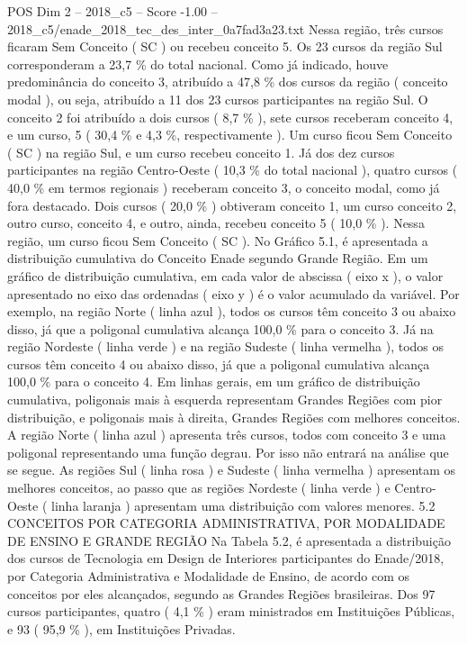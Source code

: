 \begin{textsample}{POS Dim 2 – 2018\_c5 – Score -1.00 – 2018\_c5/enade\_2018\_tec\_des\_inter\_0a7fad3a23.txt}
Nessa região, três cursos ficaram Sem Conceito ( SC ) ou recebeu conceito 5.
Os 23 cursos da região Sul corresponderam a 23,7 \% do total nacional.
Como já indicado, houve predominância do conceito 3, atribuído a 47,8 \% dos cursos da região ( conceito modal ), ou seja, atribuído a 11 dos 23 cursos participantes na região Sul.
O conceito 2 foi atribuído a dois cursos ( 8,7 \% ), sete cursos receberam conceito 4, e um curso, 5 ( 30,4 \% e 4,3 \%, respectivamente ).
Um curso ficou Sem Conceito ( SC ) na região Sul, e um curso recebeu conceito 1.
Já dos dez cursos participantes na região Centro-Oeste ( 10,3 \% do total nacional ), quatro cursos ( 40,0 \% em termos regionais ) receberam conceito 3, o conceito modal, como já fora destacado.
Dois cursos ( 20,0 \% ) obtiveram conceito 1, um curso conceito 2, outro curso, conceito 4, e outro, ainda, recebeu conceito 5 ( 10,0 \% ).
Nessa região, um curso ficou Sem Conceito ( SC ).
No Gráfico 5.1, é apresentada a distribuição cumulativa do Conceito Enade segundo Grande Região.
Em um gráfico de distribuição cumulativa, em cada valor de abscissa ( eixo x ), o valor apresentado no eixo das ordenadas ( eixo y ) é o valor acumulado da variável.
Por exemplo, na região Norte ( linha azul ), todos os cursos têm conceito 3 ou abaixo disso, já que a poligonal cumulativa alcança 100,0 \% para o conceito 3.
Já na região Nordeste ( linha verde ) e na região Sudeste ( linha vermelha ), todos os cursos têm conceito 4 ou abaixo disso, já que a poligonal cumulativa alcança 100,0 \% para o conceito 4.
Em linhas gerais, em um gráfico de distribuição cumulativa, poligonais mais à esquerda representam Grandes Regiões com pior distribuição, e poligonais mais à direita, Grandes Regiões com melhores conceitos.
A região Norte ( linha azul ) apresenta três cursos, todos com conceito 3 e uma poligonal representando uma função degrau.
Por isso não entrará na análise que se segue.
As regiões Sul ( linha rosa ) e Sudeste ( linha vermelha ) apresentam os melhores conceitos, ao passo que as regiões Nordeste ( linha verde ) e Centro-Oeste ( linha laranja ) apresentam uma distribuição com valores menores. 5.2 CONCEITOS POR CATEGORIA ADMINISTRATIVA, POR MODALIDADE DE ENSINO E GRANDE REGIÃO Na Tabela 5.2, é apresentada a distribuição dos cursos de Tecnologia em Design de Interiores participantes do Enade/2018, por Categoria Administrativa e Modalidade de Ensino, de acordo com os conceitos por eles alcançados, segundo as Grandes Regiões brasileiras.
Dos 97 cursos participantes, quatro ( 4,1 \% ) eram ministrados em Instituições Públicas, e 93 ( 95,9 \% ), em Instituições Privadas.

\end{textsample}
